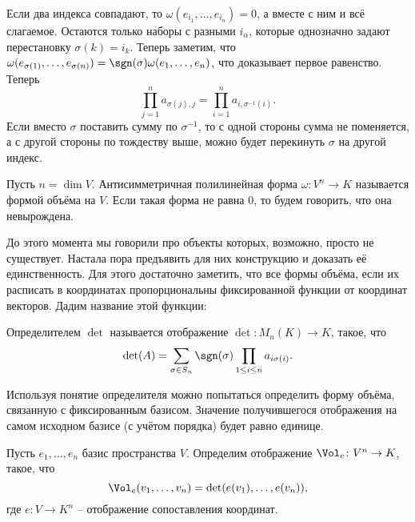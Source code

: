 Если два индекса совпадают, то $\omega(e_{i_1},\dots,e_{i_n})=0$, а вместе с ним и всё слагаемое. Остаются только наборы с разными $i_{\alpha}$, которые однозначно задают перестановку $\sigma(k)=i_k$. Теперь заметим, что $\omega(e_{\sigma(1)},\dots,e_{\sigma(n)})=\sgn(\sigma)\omega(e_1,\dots,e_n)$, что доказывает первое равенство. Теперь
$$\prod_{j=1}^n a_{\sigma(j),j}=\prod_{i=1}^n a_{i,\sigma^{-1}(i)}.$$
Если вместо $\sigma$ поставить сумму по $\sigma^{-1}$, то с одной стороны сумма не поменяется, а с другой стороны по тождеству выше, можно будет перекинуть $\sigma$ на другой индекс.
\endproof
\elm







\dfn
Пусть $n=\dim V$. Антисимметричная полилинейная форма $\omega \colon V^n \to K $ называется формой объёма на $V$. Если такая форма не равна 0, то будем говорить, что она невырождена.
\edfn



До этого момента мы говорили про объекты которых, возможно, просто не существует. Настала пора предъявить для них конструкцию и доказать её единственность. Для этого достаточно заметить, что все формы объёма, если их расписать в координатах пропорциональны фиксированной функции от координат векторов. Дадим название этой функции:

\dfn  Определителем $\det$ называется отображение $\det \colon M_n(K) \to K$, такое, что $$\det(A)=\sum_{\sigma \in S_n} \sgn(\sigma)\prod_{1\leq i\leq n} a_{i\sigma(i)}.$$
\edfn

Используя понятие определителя можно попытаться определить форму объёма, связанную с фиксированным базисом. Значение получившегося отображения на  самом исходном базисе (с учётом порядка) будет равно единице.

\dfn Пусть $e_1,\dots,e_n$ базис пространства $V$. Определим отображение $\Vol_e \colon V^n \to K$, такое, что
$$\Vol_e(v_1,\dots,v_n)=\det(e(v_1),\dots, e(v_n)),$$
где $e\colon V \to K^n$ -- отображение сопоставления координат.
\edfn

